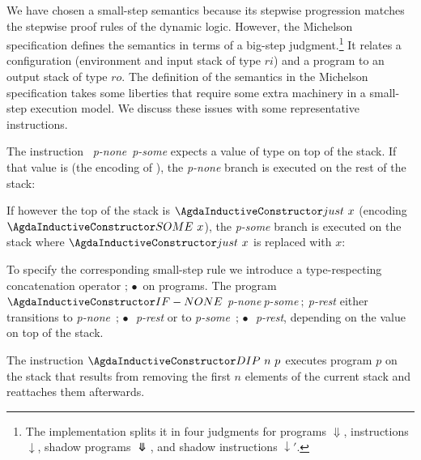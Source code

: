 We have chosen a small-step semantics because its stepwise progression
matches the stepwise proof rules of the dynamic logic. However, 
the Michelson specification defines the semantics in terms of a big-step
judgment.\footnote{The implementation splits it in four judgments for
  programs $\Downarrow$, instructions $\downarrow$, shadow programs $\Ddownarrow$,
  and shadow instructions $\downarrow'$.}
\BigstepConfiguration
\BigstepJudgment
It relates a configuration (environment and input stack of type $ri$) and a
program to an output stack of type $ro$.
The definition of the semantics in the Michelson specification takes
some liberties that require some extra machinery in a small-step execution
model. We discuss these issues with some representative instructions.

The instruction ~\textit{p-none}~\textit{p-some} expects
a value of  type  on top of the stack.
If that value is  (the encoding of ), the
\textit{p-none} branch is executed on the rest of the stack:
\BigstepIfNone


If however the top of the stack is $\ACon{just}~x$ (encoding $\ACon{SOME}~x$),
the \textit{p-some} branch is executed on the stack where  $\ACon{just}~x$
is replaced with $x$:
\BigstepIfSome

To specify the corresponding small-step rule we introduce a type-respecting concatenation
operator $;\!\bullet$ on programs. 
The program $\ACon{IF-NONE}~$\textit{p-none}$~$\textit{p-some}$~;~$\textit{p-rest} either transitions to
\textit{p-none}~$;\!\bullet$~\textit{p-rest} or to \textit{p-some}~$;\!\bullet$~\textit{p-rest},
depending on the value on top of the stack.

The instruction $\ACon{DIP}~n~p$ executes program $p$ on the stack that results from removing the first $n$ elements
of the current stack and reattaches them afterwards.
\BigstepDIP


